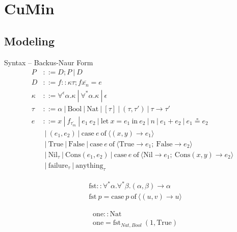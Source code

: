 \documentclass{beamer}
\begin{document}
\section{CuMin}
\subsection{Modeling}
\begin{frame}{Syntax -- Backus-Naur Form}
\begin{align*}
P &::= D;P \:|\:D \\
D &::= f :: \kappa \tau; f \overline{x_{n}} = e\\
\kappa &::= \forall^{\epsilon} \alpha.\kappa \:|\: \forall^{*}\alpha.\kappa \:|\: \epsilon \\
\tau &::= \alpha \:|\: \text{Bool} \:|\: \text{Nat} \:|\: [\tau] \:|\: (\tau,\tau ') \:|\: \tau \rightarrow \tau ' \\
e &::= x \:|\: f_{\overline{\tau_{m}}} \:|\: e_{1}\: e_{2} \:|\: \text{let}\: x = e_{1} \:\text{in}\: e_{2} \:|\: n \:|\: e_{1} + e_{2} \:|\: e_{1} \circeq e_{2}\\
&\:|\: (e_{1},e_{2}) \:|\: \text{case}\: e \:\text{of}\: \langle (x,y) \rightarrow e_{1}\rangle\\
&\:|\: \text{True} \:|\: \text{False} \:|\: \text{case}\: e \:\text{of}\: \langle \text{True} \rightarrow e_{1};\:\text{False} \rightarrow e_{2}\rangle\\
&\:|\: \text{Nil}_{\tau} \:|\: \text{Cons}(e_{1}, e_{2}) \:|\: \text{case}\: e \:\text{of}\: \langle \text{Nil} \rightarrow e_{1};\:\text{Cons}(x,y) \rightarrow e_{2}\rangle\\
&\:|\: \text{failure}_{\tau} \:|\: \text{anything}_{\tau}
\end{align*}
\end{frame}
\begin{frame}
\begin{minipage}{.45 \linewidth}
	\begin{align*}
	&\text{fst}::\forall^{*}\alpha.\forall^{*}\beta.(\alpha, \beta) \rightarrow\alpha\\
	&\text{fst}\: p = \text{case}\: p\: \text{of}\: \langle(u,v) \rightarrow u\rangle
	\end{align*}
\end{minipage}
\begin{minipage}{.45 \linewidth}
	\begin{align*}
	&\text{one} :: \text{Nat}\\
	&\text{one} = \text{fst}_{Nat, Bool} ~ (1, \text{True})
	\end{align*}
\end{minipage}
\end{frame}
\end{document}
